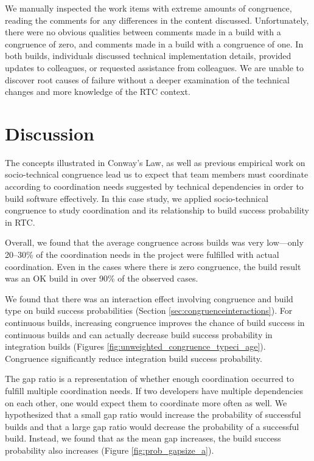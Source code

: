 We manually inspected the work items with extreme amounts of congruence, reading the comments for any differences in the content discussed. Unfortunately, there were no obvious qualities between comments made in a build with a congruence of zero, and comments made in a build with a congruence of one. In both builds, individuals discussed technical implementation details, provided updates to colleagues, or requested assistance from colleagues. We are unable to discover root causes of failure without a deeper examination of the technical changes and more knowledge of the RTC context.


\section{Discussion}
\label{sec:discussion}
The concepts illustrated in Conway's Law, as well as previous empirical work on socio-technical congruence lead us to expect that team members must coordinate according to coordination needs suggested by technical dependencies in order to build software effectively.
In this case study, we applied socio-technical congruence to study coordination and its relationship to build success probability in RTC. 

Overall, we found that the average congruence across builds was very low---only 20--30\% of the coordination needs in the project were fulfilled with actual coordination. Even in the cases where there is zero congruence, the build result was an OK build in over 90\% of the observed cases.

We found that there was an interaction effect involving congruence and build type on build success probabilities (Section \ref{sec:congruenceinteractions}). For continuous builds, increasing congruence improves the chance of build success in continuous builds and can actually decrease build success probability in integration builds (Figures \ref{fig:unweighted_congruence_typeci_age}). Congruence significantly reduce integration build success probability.

The gap ratio is a representation of whether enough coordination
occurred to fulfill multiple coordination needs. If two developers have multiple dependencies on each other, one would expect them to
coordinate more often as well.
We hypothesized that a small gap ratio would increase the probability of successful builds and that a large gap ratio would decrease the probability of a successful build. Instead, we found that as the mean gap increases, the build success probability also increases (Figure \ref{fig:prob_gapsize_a}).

